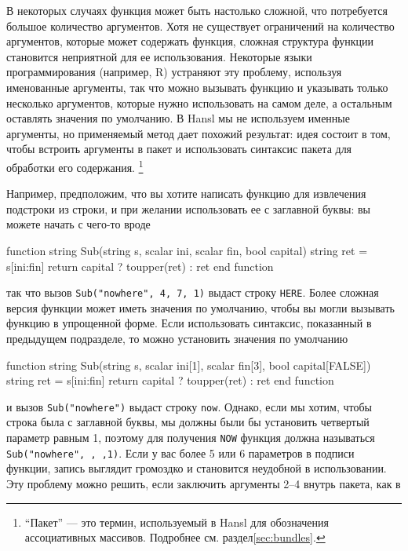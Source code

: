 В некоторых случаях функция может быть настолько сложной, что
потребуется большое количество аргументов. Хотя не существует
ограничений на количество аргументов, которые может содержать функция,
сложная структура функции становится неприятной для ее
использования. Некоторые языки программирования (например, R)
устраняют эту проблему, используя именованные аргументы, так что можно
вызывать функцию и указывать только несколько аргументов, которые
нужно использовать на самом деле, а остальным оставлять значения по
умолчанию.  В Hansl мы не используем именные аргументы, но применяемый
метод дает похожий результат: идея состоит в том, чтобы встроить
аргументы в пакет и использовать синтаксис пакета для обработки его
содержания. \footnote{``Пакет'' --- это термин, используемый в Hansl
  для обозначения ассоциативных массивов. Подробнее
  см. раздел\ref{sec:bundles}.}

Например, предположим, что вы хотите написать функцию для извлечения
подстроки из строки, и при желании использовать ее с заглавной буквы:
вы можете начать с чего-то вроде
\begin{code}
function string Sub(string s, scalar ini, scalar fin, bool capital)
    string ret = s[ini:fin]
    return capital ? toupper(ret) : ret
end function
\end{code}
так что вызов \texttt{Sub("nowhere", 4, 7, 1)} выдаст строку
\texttt{HERE}. Более сложная версия функции может иметь значения по
умолчанию, чтобы вы могли вызывать функцию в упрощенной форме. Если
использовать синтаксис, показанный в предыдущем подразделе, то можно
установить значения по умолчанию
\begin{code}
function string Sub(string s, scalar ini[1], scalar fin[3], bool capital[FALSE])
    string ret = s[ini:fin]
    return capital ? toupper(ret) : ret
end function
\end{code}
и вызов \texttt{Sub("nowhere")} выдаст строку \texttt{now}. Однако,
если мы хотим, чтобы строка была с заглавной буквы, мы должны были бы
установить четвертый параметр равным 1, поэтому для получения
\texttt{NOW} функция должна называться \texttt{Sub("nowhere", ,
  ,1)}. Если у вас более 5 или 6 параметров в подписи функции, запись
выглядит громоздко и становится неудобной в использовании.  Эту
проблему можно решить, если заключить аргументы 2–4 внутрь пакета, как
в

